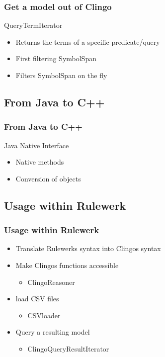 \documentclass{beamer}
\begin{document}
\begin{frame}
\frametitle{Get a model out of Clingo}
QueryTermIterator
\begin{itemize}
\item Returns the terms of a specific predicate/query
\item First filtering SymbolSpan
\item Filters SymbolSpan on the fly
\end{itemize}

\end{frame}

\subsection{From Java to C++}
\begin{frame}
\frametitle{From Java to C++}
Java Native Interface
\begin{itemize}
\item Native methods
\item Conversion of objects
\end{itemize}
\end{frame}

\subsection{Usage within Rulewerk}
\begin{frame}
\frametitle{Usage within Rulewerk}
\begin{itemize}
\item Translate Rulewerks syntax into Clingos syntax
\item Make Clingos functions accessible
\begin{itemize}
\item ClingoReasoner
\end{itemize}
\item load CSV files
\begin{itemize}
\item CSVloader
\end{itemize}
\item Query a resulting model
\begin{itemize}
\item ClingoQueryResultIterator
\end{itemize}
\end{itemize}
\end{frame}
\end{document}

